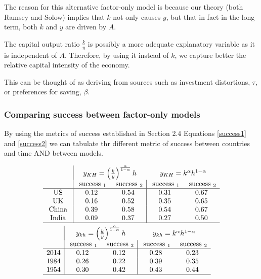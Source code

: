 \documentclass[11pt]{article}
\begin{document}
The reason for this alternative factor-only model is because our theory (both Ramsey and Solow) implies that $k$ not only causes $y$, but that in fact in the long term, both $k$ and $y$ are driven by $A$.

The capital output ratio $\frac{k}{y}$ is possibly a more adequate explanatory variable as it is independent of $A$. Therefore, by using it instead of $k$, we capture better the relative capital intensity of the economy.
\begin{intu}
    This can be thought of as deriving from sources such as investment distortions, $\tau$, or preferences for saving, $\beta$.
\end{intu}

\subsubsection{Comparing success between factor-only models}

By using the metrics of success established in Section 2.4 Equations \eqref{success1} and \eqref{success2} we can tabulate thr different metric of success between countries and time AND between models.

\begin{equation}
\begin{aligned}
&\begin{array}{c|cc|cc} 
& \multicolumn{2}{|c}{y_{K H}=\left(\frac{k}{y}\right)^{\frac{\alpha}{1-\alpha}} h} & \multicolumn{2}{c}{y_{K H}=k^\alpha h^{1-\alpha}} \\
& \text { success }_1 & \text { success }_2 & \text { success }_1 & \text { success }_2 \\
\hline \text { US } & 0.12 & 0.54 & 0.31 & 0.67 \\
\text { UK } & 0.16 & 0.52 & 0.35 & 0.65 \\
\text { China } & 0.39 & 0.58 & 0.54 & 0.67 \\
\text { India } & 0.09 & 0.37 & 0.27 & 0.50 \\
\hline
\end{array}\\
&\begin{array}{c|cc|cc} 
& \multicolumn{2}{|c}{y_{k h}=\left(\frac{k}{y}\right)^{\frac{\alpha}{1-\alpha}} h} & \multicolumn{2}{c}{y_{k h}=k^\alpha h^{1-\alpha}} \\
& \text { success }_1 & \text { success }_2 & \text { success }_1 & \text { success }_2 \\
\hline 2014 & 0.12 & 0.12 & 0.28 & 0.23 \\
1984 & 0.26 & 0.22 & 0.39 & 0.35 \\
1954 & 0.30 & 0.42 & 0.43 & 0.44 \\
\hline
\end{array}
\end{aligned}
\end{equation}
\end{document}
